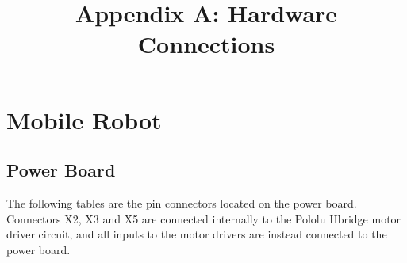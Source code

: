 \documentclass[11pt,a4paper]{article}
\begin{document}
\title{Appendix A: Hardware Connections}
\maketitle

\section{Mobile Robot}
\subsection{Power Board}
  \label{appA:Power Board}
  The following tables are the pin connectors located on the power board. Connectors X2, X3 and X5 are connected internally to the Pololu Hbridge motor driver circuit, and all inputs to the motor drivers are instead connected to the power board.
  \\
\end{document}
